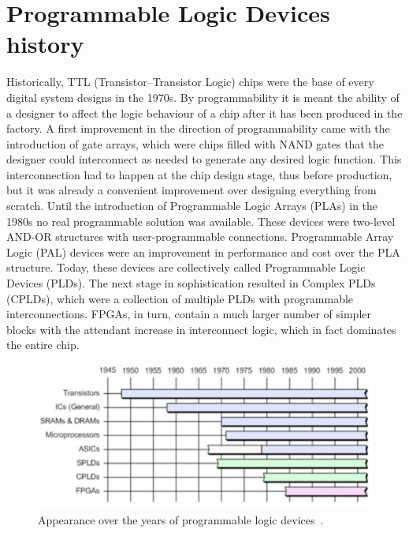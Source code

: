 \section{Programmable Logic Devices history}
\noindent Historically, TTL (Transistor–Transistor Logic) chips were the base of every digital system designs in
the 1970s.
By programmability it is meant the ability of a
designer to affect the logic behaviour of a chip after it has been produced in the factory.
\newline
\noindent A first improvement in the direction of programmability came with the introduction of gate
arrays, which were chips filled with NAND gates that the designer could
interconnect as needed to generate any desired logic function.
This interconnection had to happen
at the chip design stage, thus before production, but it was already a convenient improvement over
designing everything from scratch. Until the introduction of Programmable Logic
Arrays (PLAs) in the 1980s no real programmable solution was available. These devices were two-level AND-OR
structures with user-programmable connections.
\newline 
\noindent Programmable Array Logic (PAL) devices were an
improvement in performance and cost over the PLA structure. Today, these devices are collectively
called Programmable Logic Devices (PLDs).
\newline
\noindent The next stage in sophistication resulted in Complex PLDs (CPLDs), which were a collection of multiple PLDs with programmable interconnections. FPGAs, in turn, contain a
much larger number of simpler blocks with the attendant increase in interconnect logic, which in fact
dominates the entire chip.
\begin{figure}[H]
	\centering
	\includegraphics[width=0.7\linewidth]{IMG/ch3/TIME}
	\caption{Appearance over the years of programmable logic devices~\cite{fpga3}.}
	\label{fig:time}
\end{figure}
